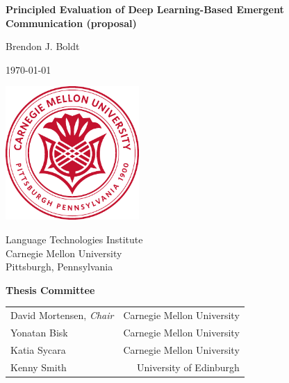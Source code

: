 \thispagestyle{title}
\begin{centering}
\textbf{\LARGE Principled Evaluation of Deep Learning-Based Emergent Communication (proposal)}

\vspace{3pc}
{\large Brendon J. Boldt}

\vspace{2pc}
\today{}

\vfill

\includegraphics[width=2in]{assets/cmu-seal-r}

\vfill

Language Technologies Institute \\
Carnegie Mellon University \\
Pittsburgh, Pennsylvania

\vspace{4pc}

\textbf{Thesis Committee}
\vspace{0.5pc}

\begin{tabular}{lr}
  David Mortensen, \emph{Chair} & Carnegie Mellon University \\
  Yonatan Bisk & Carnegie Mellon University \\
  Katia Sycara & Carnegie Mellon University \\
  Kenny Smith & University of Edinburgh
\end{tabular}

\end{centering}

